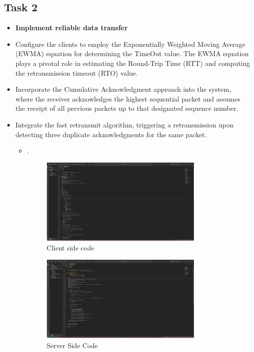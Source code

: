 \documentclass[11pt]{article}
\begin{document}
\subsection{Task 2}
\begin{itemize}
\item \textbf{Implement reliable data transfer}
 \item Configure the clients to employ the Exponentially Weighted Moving Average (EWMA) equation for determining the TimeOut value. The EWMA equation plays a pivotal role in estimating the Round-Trip Time (RTT) and computing the retransmission timeout (RTO) value.

\item Incorporate the Cumulative Acknowledgment approach into the system, where the receiver acknowledges the highest sequential packet and assumes the receipt of all previous packets up to that designated sequence number.

\item Integrate the fast retransmit algorithm, triggering a retransmission upon detecting three duplicate acknowledgments for the same packet.


\begin{itemize}
    \item \textbf{}
    
  . 
    \begin{figure}[H]
        \centering
        \includegraphics[width=0.8\textwidth]{Task-2-Client.png}
        \caption{Client side code}
        \label{fig:1}
    \end{figure}
    
    \begin{figure}[H]
        \centering
        \includegraphics[width=0.8\textwidth]{Task-2-Server.png}
        \caption{Server Side Code}
        \label{fig:2}
    \end{figure}
    


\end{itemize}
\end{itemize}
\end{document}
